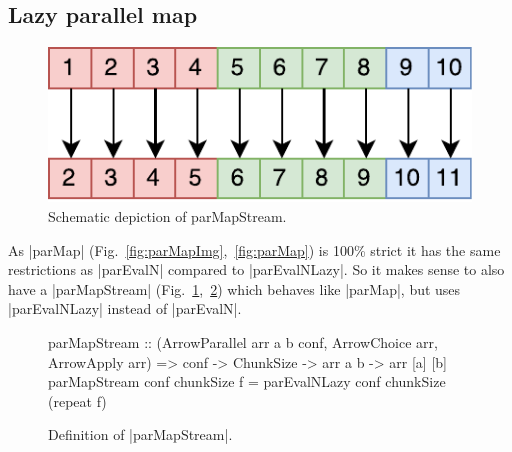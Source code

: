 \subsection{Lazy parallel map}
\begin{figure}[h]
	\includegraphics[scale=0.7]{images/parMapStream}
	\caption{Schematic depiction of parMapStream.}
	\label{fig:parMapStreamImg}
\end{figure}
As |parMap| (Fig.~\ref{fig:parMapImg},~\ref{fig:parMap}) is 100\% strict it has the same restrictions as |parEvalN| compared to |parEvalNLazy|. So it makes sense to also have a |parMapStream| (Fig.~\ref{fig:parMapStreamImg},~\ref{fig:parMapStream}) which behaves like |parMap|, but uses |parEvalNLazy| instead of |parEvalN|.
\begin{figure}[h]
\begin{code}
parMapStream :: (ArrowParallel arr a b conf, ArrowChoice arr, ArrowApply arr) =>
	conf -> ChunkSize -> arr a b -> arr [a] [b]
parMapStream conf chunkSize f = parEvalNLazy conf chunkSize (repeat f)
\end{code}
\caption{Definition of |parMapStream|.}
\label{fig:parMapStream}
\end{figure}

